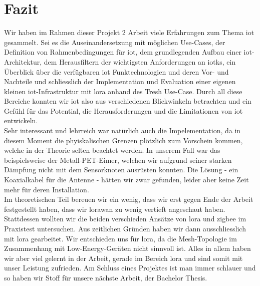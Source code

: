 \chapter{Fazit}

Wir haben im Rahmen dieser Projekt 2 Arbeit viele Erfahrungen zum Thema \gls{iot} gesammelt. Sei es die Auseinandersetzung mit möglichen Use-Cases, der Definition von Rahmenbedingungen für \gls{iot}, dem grundlegenden Aufbau einer \gls{iot}-Architektur, dem Herausfiltern der wichtigsten Anforderungen an \glspl{iotk}, ein Überblick über die verfügbaren \gls{iot} Funktechnologien und deren Vor- und Nachteile und schliesslich der Implementation und Evaluation einer eigenen kleinen \gls{iot}-Infrastruktur mit \gls{lora} anhand des Tresh Use-Case. Durch all diese Bereiche konnten wir \gls{iot} also aus verschiedenen Blickwinkeln betrachten und ein Gefühl für das Potential, die Herausforderungen und die Limitationen von \gls{iot} entwickeln.\\
Sehr interessant und lehrreich war natürlich auch die Impelementation, da in diesem Moment die phyiskalischen Grenzen plötzlich zum Vorschein kommen, welche in der Theorie selten beachtet werden. In unserem Fall war das beispielsweise der Metall-PET-Eimer, welchen wir aufgrund seiner starken Dämpfung nicht mit dem Sensorknoten ausrüsten konnten. Die Lösung - ein Koaxialkabel für die Antenne - hätten wir zwar gefunden, leider aber keine Zeit mehr für deren Installation.\\
Im theoretischen Teil bereuen wir ein wenig, dass wir erst gegen Ende der Arbeit festgestellt haben, dass wir \gls{lorawan} zu wenig vertieft angeschaut haben. Stattdessen wollten wir die beiden verschieden Ansätze von \gls{lora} und \gls{zigbee} im Praxistest untersuchen. Aus zeitlichen Gründen haben wir dann ausschliesslich mit \gls{lora} gearbeitet. Wir entschieden uns für \gls{lora}, da die Mesh-Topologie im Zusammenhang mit Low-Energy-Geräten nicht sinnvoll ist.
Alles in allem haben  wir aber viel gelernt in der Arbeit, gerade im Bereich \gls{lora} und sind somit mit unser Leistung zufrieden. Am Schluss eines Projektes ist man immer schlauer und so haben wir Stoff für unsere nächste Arbeit, der Bachelor Thesis.
